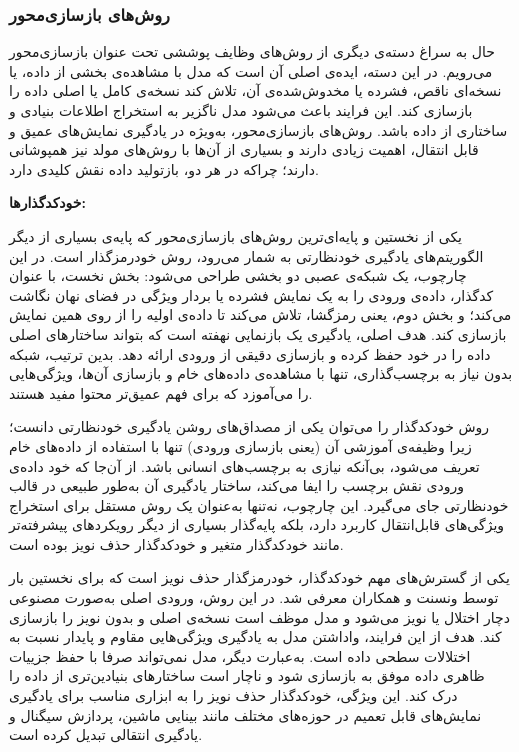 \subsubsection{روش‌های بازسازی‌محور}

حال به سراغ دسته‌ی دیگری از روش‌های وظایف پوششی تحت عنوان بازسازی‌محور می‌رویم. در این دسته، ایده‌ی اصلی آن است که مدل با مشاهده‌ی بخشی از داده، یا نسخه‌ای ناقص، فشرده یا مخدوش‌شده‌ی آن، تلاش کند نسخه‌ی کامل یا اصلی داده را بازسازی کند. این فرایند باعث می‌شود مدل ناگزیر به استخراج اطلاعات بنیادی و ساختاری از داده باشد. روش‌های بازسازی‌محور، به‌ویژه در یادگیری نمایش‌های عمیق و قابل انتقال، اهمیت زیادی دارند و بسیاری از آن‌ها با روش‌های مولد نیز همپوشانی دارند؛ چراکه در هر دو، بازتولید داده نقش کلیدی دارد.\newline

\noindent\textbf{خودکدگذارها:}

یکی از نخستین و پایه‌ای‌ترین روش‌های بازسازی‌محور که پایه‌ی بسیاری از دیگر الگوریتم‌های یادگیری خودنظارتی به شمار می‌رود، روش خودر‌مزگذار است. در این چارچوب، یک شبکه‌ی عصبی دو بخشی طراحی می‌شود: بخش نخست، با عنوان کدگذار، داده‌ی ورودی را به یک نمایش فشرده یا بردار ویژگی در فضای نهان نگاشت می‌کند؛ و بخش دوم، یعنی رمزگشا، تلاش می‌کند تا داده‌ی اولیه را از روی همین نمایش بازسازی کند. هدف اصلی، یادگیری یک بازنمایی نهفته است که بتواند ساختارهای اصلی داده را در خود حفظ کرده و بازسازی دقیقی از ورودی ارائه دهد. بدین ترتیب، شبکه بدون نیاز به برچسب‌گذاری، تنها با مشاهده‌ی داده‌های خام و بازسازی آن‌ها، ویژگی‌هایی را می‌آموزد که برای فهم عمیق‌تر محتوا مفید هستند.

روش خودکدگذار را می‌توان یکی از مصداق‌های روشن یادگیری خودنظارتی دانست؛ زیرا وظیفه‌ی آموزشی آن (یعنی بازسازی ورودی) تنها با استفاده از داده‌های خام تعریف می‌شود، بی‌آنکه نیازی به برچسب‌های انسانی باشد. از آن‌جا که خود داده‌ی ورودی نقش برچسب را ایفا می‌کند، ساختار یادگیری آن به‌طور طبیعی در قالب خودنظارتی جای می‌گیرد. این چارچوب، نه‌تنها به‌عنوان یک روش مستقل برای استخراج ویژگی‌های قابل‌انتقال کاربرد دارد، بلکه پایه‌گذار بسیاری از دیگر رویکردهای پیشرفته‌تر مانند خودکدگذار متغیر و خودکدگذار حذف نویز بوده است.

یکی از گسترش‌های مهم خودکدگذار، خودر‌مزگذار حذف نویز است که برای نخستین بار توسط ونسنت و همکاران \cite{vincent2008extracting} معرفی شد. در این روش، ورودی اصلی به‌صورت مصنوعی دچار اختلال یا نویز می‌شود و مدل موظف است نسخه‌ی اصلی و بدون نویز را بازسازی کند. هدف از این فرایند، واداشتن مدل به یادگیری ویژگی‌هایی مقاوم و پایدار نسبت به اختلالات سطحی داده است. به‌عبارت دیگر، مدل نمی‌تواند صرفا با حفظ جزییات ظاهری داده موفق به بازسازی شود و ناچار است ساختارهای بنیادین‌تری از داده را درک کند. این ویژگی، خودکدگذار حذف نویز را به ابزاری مناسب برای یادگیری نمایش‌های قابل تعمیم در حوزه‌های مختلف مانند بینایی ماشین، پردازش سیگنال و یادگیری انتقالی تبدیل کرده است.\newline


